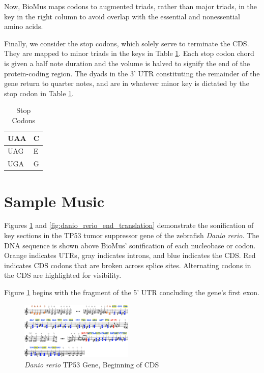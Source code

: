 \documentclass[letterpaper]{article}
\begin{document}
Now, BioMus maps codons to augmented triads, rather than major triads, in the key in the right column to avoid overlap with the essential and nonessential amino acids. 


Finally, we consider the stop codons, which solely serve to terminate the CDS. They are mapped to minor triads in the keys in Table \ref{table:stop_codons}. Each stop codon chord is given a half note duration and the volume is halved to signify the end of the protein-coding region. The dyads in the 3' UTR constituting the remainder of the gene return to quarter notes, and are in whatever minor key is dictated by the stop codon in Table \ref{table:stop_codons}. 

\begin{table}[h!]
\centering
\vspace{-3mm}
\begin{tabular}{|l|l|}
\hline
UAA & C \\ \hline
UAG & E \\ \hline
UGA & G \\ \hline
\end{tabular}
\caption{Stop Codons}
\label{table:stop_codons}
\vspace{-6mm}
\end{table}

\section{Sample Music}

Figures \ref{fig:danio_rerio_start_translation} and \ref{fig:danio_rerio_end_translation} demonstrate the sonification of key sections in the TP53 tumor suppressor gene of the zebrafish \textit{Danio rerio}. The DNA sequence is shown above BioMus' sonification of each nucleobase or codon. Orange indicates UTRs, gray indicates introns, and blue indicates the CDS. Red indicates CDS codons that are broken across splice sites. Alternating codons in the CDS are highlighted for visibility.

Figure \ref{fig:danio_rerio_start_translation} begins with the fragment of the 5' UTR concluding the gene's first exon. 

\begin{figure}[h!]
\centering
\includegraphics[width=0.48\textwidth]{images/danio_rerio_start_translation}
\vspace{-3mm}
  \caption{\textit{Danio rerio} TP53 Gene, Beginning of CDS}
  \label{fig:danio_rerio_start_translation}
  \vspace{-3mm}
\end{figure}
\end{document}

